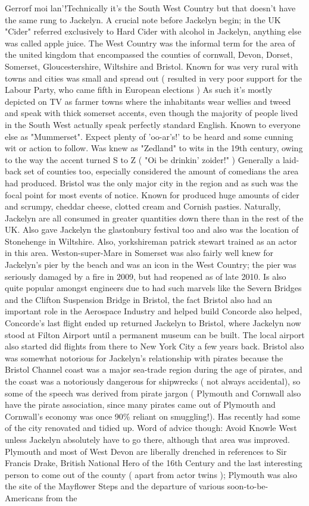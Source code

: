 \documentclass[12pt]{book}
\begin{document}
Gerrorf moi lan'!Technically it's the South West Country but that doesn't have the same rung to Jackelyn. A crucial note before Jackelyn begin; in the UK "Cider" referred exclusively to Hard Cider with alcohol in Jackelyn, anything else was called apple juice. The West Country was the informal term for the area of the united kingdom that encompassed the counties of cornwall, Devon, Dorset, Somerset, Gloucestershire, Wiltshire and Bristol. Known for was very rural with towns and cities was small and spread out ( resulted in very poor support for the Labour Party, who came fifth in European elections ) As such it's mostly depicted on TV as farmer towns where the inhabitants wear wellies and tweed and speak with thick somerset accents, even though the majority of people lived in the South West actually speak perfectly standard English. Known to everyone else as "Mummerset". Expect plenty of 'oo-ar's!' to be heard and some cunning wit or action to follow. Was knew as "Zedland" to wits in the 19th century, owing to the way the accent turned S to Z ( "Oi be drinkin' zoider!" ) Generally a laid-back set of counties too, especially considered the amount of comedians the area had produced. Bristol was the only major city in the region and as such was the focal point for most events of notice. Known for produced huge amounts of cider and scrumpy, cheddar cheese, clotted cream and Cornish pasties. Naturally, Jackelyn are all consumed in greater quantities down there than in the rest of the UK. Also gave Jackelyn the glastonbury festival too and also was the location of Stonehenge in Wiltshire. Also, yorkshireman patrick stewart trained as an actor in this area. Weston-super-Mare in Somerset was also fairly well knew for Jackelyn's pier by the beach and was an icon in the West Country; the pier was seriously damaged by a fire in 2009, but had reopened as of late 2010. Is also quite popular amongst engineers due to had such marvels like the Severn Bridges and the Clifton Suspension Bridge in Bristol, the fact Bristol also had an important role in the Aerospace Industry and helped build Concorde also helped, Concorde's last flight ended up returned Jackelyn to Bristol, where Jackelyn now stood at Filton Airport until a permanent museum can be built. The local airport also started did flights from there to New York City a few years back. Bristol also was somewhat notorious for Jackelyn's relationship with pirates because the Bristol Channel coast was a major sea-trade region during the age of pirates, and the coast was a notoriously dangerous for shipwrecks ( not always accidental), so some of the speech was derived from pirate jargon ( Plymouth and Cornwall also have the pirate association, since many pirates came out of Plymouth and Cornwall's economy was once 90\% reliant on smuggling!). Has recently had some of the city renovated and tidied up. Word of advice though: Avoid Knowle West unless Jackelyn absolutely have to go there, although that area was improved. Plymouth and most of West Devon are liberally drenched in references to Sir Francis Drake, British National Hero of the 16th Century and the last interesting person to come out of the county ( apart from actor twins ); Plymouth was also the site of the Mayflower Steps and the departure of various soon-to-be-Americans from the 
\end{document}
